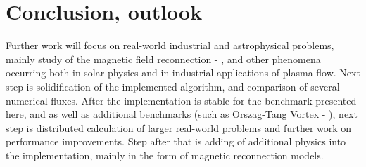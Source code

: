 \chapter{Conclusion, outlook}
Further work will focus on real-world industrial and astrophysical problems, mainly study of the magnetic field reconnection - \citep{reconnection}, and other phenomena occurring both in solar physics and in industrial applications of plasma flow. Next step is solidification of the implemented algorithm, and comparison of several numerical fluxes. After the implementation is stable for the benchmark presented here, and as well as additional benchmarks (such as Orszag-Tang Vortex - \citep{vortex}), next step is distributed calculation of larger real-world problems and further work on performance improvements. Step after that is adding of additional physics into the implementation, mainly in the form of magnetic reconnection models.